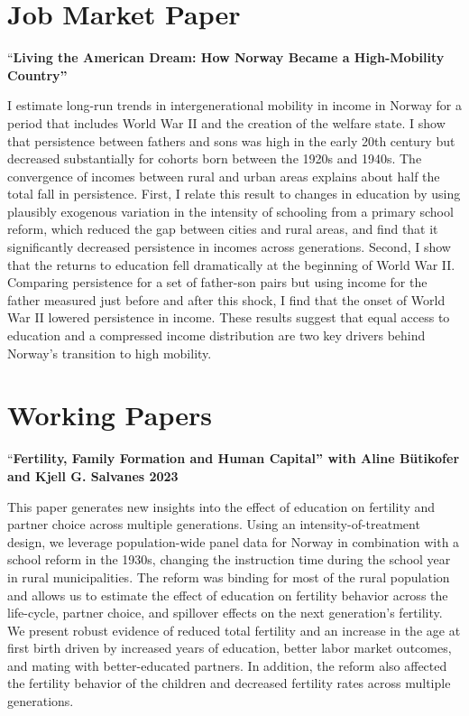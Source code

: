 \documentclass[11pt,]{article}
\begin{document}
\hypertarget{job-market-paper}{%
\section{Job Market Paper}\label{job-market-paper}}

``\textbf{Living the American Dream: How Norway Became a High-Mobility
Country''}

I estimate long-run trends in intergenerational mobility in income in
Norway for a period that includes World War II and the creation of the
welfare state. I show that persistence between fathers and sons was high
in the early 20th century but decreased substantially for cohorts born
between the 1920s and 1940s. The convergence of incomes between rural
and urban areas explains about half the total fall in persistence.
First, I relate this result to changes in education by using plausibly
exogenous variation in the intensity of schooling from a primary school
reform, which reduced the gap between cities and rural areas, and find
that it significantly decreased persistence in incomes across
generations. Second, I show that the returns to education fell
dramatically at the beginning of World War II. Comparing persistence for
a set of father-son pairs but using income for the father measured just
before and after this shock, I find that the onset of World War II
lowered persistence in income. These results suggest that equal access
to education and a compressed income distribution are two key drivers
behind Norway's transition to high mobility.
\vspace{0.3cm}\vspace{-0.2cm}

\vspace{0.5cm}

\clearpage

\hypertarget{working-papers}{%
\section{Working Papers}\label{working-papers}}

``\textbf{Fertility, Family Formation and Human Capital'' with Aline
Bütikofer and Kjell G. Salvanes \hfill 2023}

This paper generates new insights into the effect of education on
fertility and partner choice across multiple generations. Using an
intensity-of-treatment design, we leverage population-wide panel data
for Norway in combination with a school reform in the 1930s, changing
the instruction time during the school year in rural municipalities. The
reform was binding for most of the rural population and allows us to
estimate the effect of education on fertility behavior across the
life-cycle, partner choice, and spillover effects on the next
generation's fertility. We present robust evidence of reduced total
fertility and an increase in the age at first birth driven by increased
years of education, better labor market outcomes, and mating with
better-educated partners. In addition, the reform also affected the
fertility behavior of the children and decreased fertility rates across
multiple generations. \vspace{0.3cm}\vspace{-0.2cm}
\end{document}
